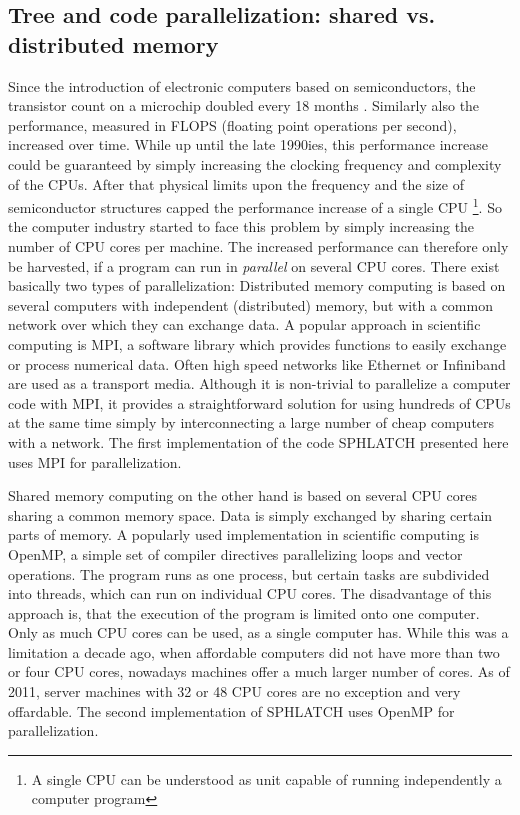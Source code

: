 \subsection{Tree and code parallelization: shared vs. distributed memory}
Since the introduction of electronic computers based on semiconductors, the transistor count on a microchip doubled every 18 months \citep{Moore:1965p4006}. Similarly also the performance, measured in FLOPS (floating point operations per second), increased over time. While up until the late 1990ies, this performance increase could be guaranteed by simply increasing the clocking frequency and complexity of the CPUs. After that physical limits upon the frequency and the size of semiconductor structures capped the performance increase of a single CPU \footnote{A single CPU can be understood as unit capable of running independently a computer program}. So the computer industry started to face this problem by simply increasing the number of CPU cores per machine. The increased performance can therefore only be harvested, if a program can run in \emph{parallel} on several CPU cores. There exist basically two types of parallelization: 
Distributed memory computing is based on several computers with independent (distributed) memory, but with a common network over which they can exchange data. A popular approach in scientific computing is MPI, a software library which provides functions to easily exchange or process numerical data. Often high speed networks like Ethernet or Infiniband are used as a transport media. Although it is non-trivial to parallelize a computer code with MPI, it provides a straightforward solution for using hundreds of CPUs at the same time simply by interconnecting a large number of cheap computers with a network. The first implementation of the code SPHLATCH presented here uses MPI for parallelization. 

Shared memory computing on the other hand is based on several CPU cores sharing a common memory space. Data is simply exchanged by sharing certain parts of memory. A popularly used implementation in scientific computing is OpenMP, a simple set of compiler directives parallelizing loops and vector operations. The program runs as one process, but certain tasks are subdivided into threads, which can run on individual CPU cores. The disadvantage of this approach is, that the execution of the program is limited onto one computer. Only as much CPU cores can be used, as a single computer has. While this was a limitation a decade ago, when affordable computers did not have more than two or four CPU cores, nowadays machines offer a much larger number of cores. As of 2011, server machines with 32 or 48 CPU cores are no exception and very offardable. The second implementation of SPHLATCH uses OpenMP for parallelization.


